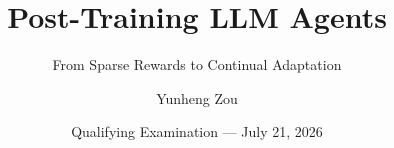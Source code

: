 \title{Post-Training LLM Agents}
\subtitle{From Sparse Rewards to Continual Adaptation}
\author{Yunheng Zou}
\date{Qualifying Examination --- July 21, 2026}
